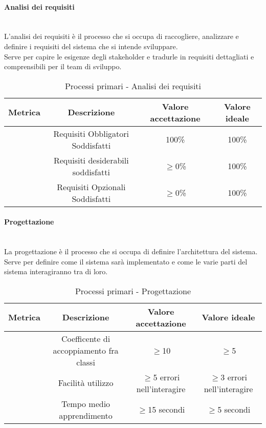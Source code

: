 \documentclass[11pt]{article}
\begin{document}
\begin{justify}
\paragraph{Analisi dei requisiti}\mbox{}\\
L'analisi dei requisiti è il processo che si occupa di raccogliere, analizzare e definire i requisiti del sistema che si intende sviluppare.\\
Serve per capire le esigenze degli stakeholder e tradurle in requisiti dettagliati e comprensibili per il team di sviluppo.\\
\begin{table}[H]
  \centering
\begin{tabular}{|c|c|c|c|}
  \hline
  \textbf{Metrica} & \textbf{Descrizione} & \textbf{Valore accettazione} & \textbf{Valore ideale}\\
  \hline
  & Requisiti Obbligatori Soddisfatti & 100\% & 100\%\\
  \hline
  & Requisiti desiderabili soddisfatti  & $\geq$0\% & 100\% \\
  \hline
  & Requisiti Opzionali Soddisfatti & $\geq$0\% & 100\% \\
  \hline
\end{tabular}
\caption{Processi primari - Analisi dei requisiti}
\label{tab:analisi dei requisiti}
\end{table}
\paragraph{Progettazione}\mbox{}\\
La progettazione è il processo che si occupa di definire l'architettura del sistema.\\
Serve per definire come il sistema sarà implementato e come le varie parti del sistema interagiranno tra di loro.\\
\begin{table}[H]
  \centering
\begin{tabular}{|c|c|c|c|}
  \hline
  \textbf{Metrica} & \textbf{Descrizione} & \textbf{Valore accettazione} & \textbf{Valore ideale}\\
  \hline
  & Coefficente di accoppiamento fra classi & $\geq$10 & $\geq$5 \\
  \hline
  & Facilità utilizzo & $\geq$5 errori nell'interagire & $\geq$3 errori nell'interagire  \\
  \hline
  & Tempo medio apprendimento & $\geq$15 secondi & $\geq$5 secondi \\
  \hline
\end{tabular}
\caption{Processi primari - Progettazione}
\label{tab:progettazione}
\end{table}


\end{justify}
\end{document}
